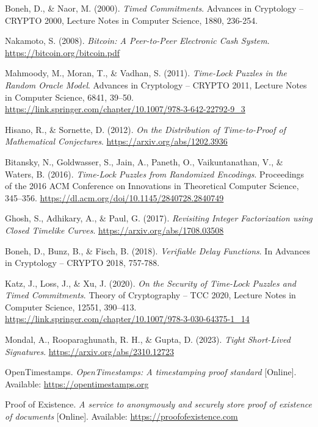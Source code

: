\documentclass[12pt]{report}
\begin{document}
\begin{thebibliography}{9}
Boneh, D., \& Naor, M. (2000). \textit{Timed Commitments}. Advances in Cryptology – CRYPTO 2000, Lecture Notes in Computer Science, 1880, 236-254.

Nakamoto, S. (2008). \textit{Bitcoin: A Peer-to-Peer Electronic Cash System}. \url{https://bitcoin.org/bitcoin.pdf}

Mahmoody, M., Moran, T., \& Vadhan, S. (2011). \textit{Time-Lock Puzzles in the Random Oracle Model}. Advances in Cryptology – CRYPTO 2011, Lecture Notes in Computer Science, 6841, 39–50. \url{https://link.springer.com/chapter/10.1007/978-3-642-22792-9_3}

Hisano, R., \& Sornette, D. (2012). \textit{On the Distribution of Time-to-Proof of Mathematical Conjectures}. \url{https://arxiv.org/abs/1202.3936}

Bitansky, N., Goldwasser, S., Jain, A., Paneth, O., Vaikuntanathan, V., \& Waters, B. (2016). \textit{Time-Lock Puzzles from Randomized Encodings}. Proceedings of the 2016 ACM Conference on Innovations in Theoretical Computer Science, 345–356. \url{https://dl.acm.org/doi/10.1145/2840728.2840749}

Ghosh, S., Adhikary, A., \& Paul, G. (2017). \textit{Revisiting Integer Factorization using Closed Timelike Curves}. \url{https://arxiv.org/abs/1708.03508}

Boneh, D., Bunz, B., \& Fisch, B. (2018). \textit{Verifiable Delay Functions}. In Advances in Cryptology – CRYPTO 2018, 757-788.

Katz, J., Loss, J., \& Xu, J. (2020). \textit{On the Security of Time-Lock Puzzles and Timed Commitments}. Theory of Cryptography – TCC 2020, Lecture Notes in Computer Science, 12551, 390–413. \url{https://link.springer.com/chapter/10.1007/978-3-030-64375-1_14}

Mondal, A., Rooparaghunath, R. H., \& Gupta, D. (2023). \textit{Tight Short-Lived Signatures}. \url{https://arxiv.org/abs/2310.12723}

OpenTimestamps. \textit{OpenTimestamps: A timestamping proof standard} [Online]. Available: \url{https://opentimestamps.org}

Proof of Existence. \textit{A service to anonymously and securely store proof of existence of documents} [Online]. Available: \url{https://proofofexistence.com}


\end{thebibliography}
\end{document}
